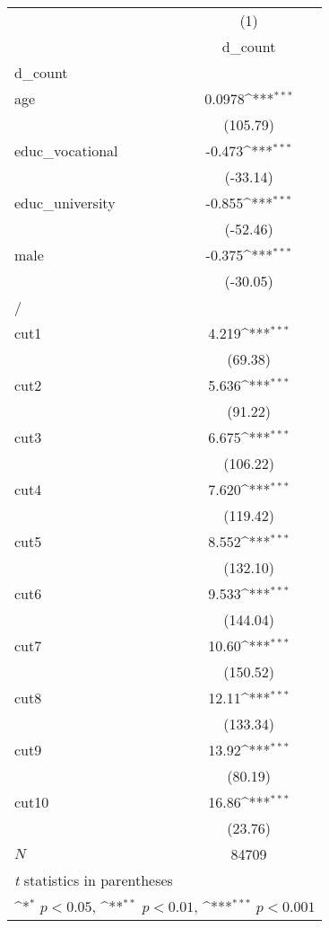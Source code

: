 {
\def\sym#1{\ifmmode^{#1}\else\(^{#1}\)\fi}
\begin{tabular}{l*{1}{c}}
\hline\hline
            &\multicolumn{1}{c}{(1)}\\
            &\multicolumn{1}{c}{d\_count}\\
\hline
d\_count     &                     \\
age         &      0.0978\sym{***}\\
            &    (105.79)         \\
[1em]
educ\_vocational&      -0.473\sym{***}\\
            &    (-33.14)         \\
[1em]
educ\_university&      -0.855\sym{***}\\
            &    (-52.46)         \\
[1em]
male        &      -0.375\sym{***}\\
            &    (-30.05)         \\
\hline
/           &                     \\
cut1        &       4.219\sym{***}\\
            &     (69.38)         \\
[1em]
cut2        &       5.636\sym{***}\\
            &     (91.22)         \\
[1em]
cut3        &       6.675\sym{***}\\
            &    (106.22)         \\
[1em]
cut4        &       7.620\sym{***}\\
            &    (119.42)         \\
[1em]
cut5        &       8.552\sym{***}\\
            &    (132.10)         \\
[1em]
cut6        &       9.533\sym{***}\\
            &    (144.04)         \\
[1em]
cut7        &       10.60\sym{***}\\
            &    (150.52)         \\
[1em]
cut8        &       12.11\sym{***}\\
            &    (133.34)         \\
[1em]
cut9        &       13.92\sym{***}\\
            &     (80.19)         \\
[1em]
cut10       &       16.86\sym{***}\\
            &     (23.76)         \\
\hline
\(N\)       &       84709         \\
\hline\hline
\multicolumn{2}{l}{\footnotesize \textit{t} statistics in parentheses}\\
\multicolumn{2}{l}{\footnotesize \sym{*} \(p<0.05\), \sym{**} \(p<0.01\), \sym{***} \(p<0.001\)}\\
\end{tabular}
}
